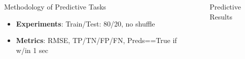 \documentclass[final]{beamer}
\newlength{\sepwidth}
\newlength{\colwidth}
\newcommand{\separatorcolumn}{\begin{column}{\sepwidth}\end{column}}
\begin{document}
\begin{frame}[t]
\begin{columns}[t]
\begin{column}{\colwidth}
\begin{exampleblock}{\huge{Methodology of Predictive Tasks}}
{\begin{itemize}
                  1. Hourly split daily usage into 24 cols (labeled 0 - 23)\\
                  2. Lookback 3-5 time steps from the current timestamp\\
                  3. One-hot-encoding; Min-Max scaler
            \item \textbf{Experiments}: Train/Test: 80/20, no shuffle 

            \item \textbf{Metrics}: RMSE, TP/TN/FP/FN, Preds==True if w/in 1 sec

          \end{itemize} }
      \end{exampleblock}

    \end{column}

    \separatorcolumn

    \begin{column}{\colwidth}

      \begin{block}
        {\huge{Predictive Results}}



\end{block}
\end{column}
\end{columns}
\end{frame}
\end{document}
